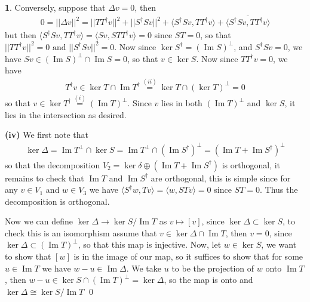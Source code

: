 \documentclass[10.5pt]{article}
\theoremstyle{definition}
\newtheorem{pb}{}
\newcommand{\gen}[1]{\langle#1\rangle}
\newcommand{\norm}[1]{\lvert\lvert#1\rvert\rvert}
\newcommand{\tand}{\text{ and }}
\begin{document}
\begin{pb}
        Conversely, suppose that \(\Delta v = 0\), then
        \begin{align}
            0 = \norm{\Delta v}^2 = \norm{TT^\dagger v}^2 + \norm{S^\dagger S v}^2 + \gen{S^\dagger S v, TT^\dagger v} + \overline{\gen{S^\dagger S v, TT^\dagger v}}
        \end{align}
        but then \(\gen{S^\dagger S v, TT^\dagger v} = \gen{Sv,STT^{\dagger}v} = 0\) since \(ST = 0\), so that \(\norm{TT^\dagger v}^2 = 0 \tand \norm{S^\dagger S v}^2 = 0\). Now since \(\ker S^\dagger = (\operatorname{Im} S)^\perp\), and \(S^\dagger S v = 0\), we have \(Sv \in (\operatorname{Im} S)^\perp \cap \operatorname{Im} S = 0\), so that \(v \in \ker S\). Now since \(TT^\dagger v = 0\), we have 
        \begin{align}
            T^\dagger v \in \ker T \cap \operatorname{Im} T^\dagger \overset{(ii)}{=} \ker T \cap (\ker T)^\perp = 0
        \end{align}
        so that \(v \in \ker T^\dagger \overset{(i)}{=} (\operatorname{Im} T)^\perp\). Since \(v\) lies in both \((\operatorname{Im} T)^\perp\) and \(\ker S\), it lies in the intersection as desired.

        \textbf{(iv)} We first note that
        \begin{align}
            \ker \Delta = \operatorname{Im} T^{\perp} \cap \ker S = \operatorname{Im} T^{\perp} \cap (\operatorname{Im} S^\dagger)^\perp = (\operatorname{Im} T + \operatorname{Im} S^\dagger)^\perp
        \end{align}
        so that the decomposition \(V_2 = \ker \delta \oplus (\operatorname{Im} T + \operatorname{Im} S^\dagger)\) is orthogonal, it remains to check that \(\operatorname{Im} T\) and \(\operatorname{Im} S^\dagger\) are orthogonal, this is simple since for any \(v \in V_1\) and \(w \in V_3\) we have \(\gen{S^\dagger w, Tv} = \gen{w,ST v} = 0\) since \(ST = 0\). Thus the decomposition is orthogonal.

        Now we can define \(\ker \Delta \to \ker S/\operatorname{Im} T\) as \(v \mapsto [v]\), since \(\ker \Delta \subset \ker S\), to check this is an isomorphism assume that \(v \in \operatorname{ker} \Delta \cap \operatorname{Im} T\), then \(v = 0\), since \(\ker \Delta \subset (\operatorname{Im} T)^\perp\), so that this map is injective. Now, let \(w \in \ker S\), we want to show that \([w]\) is in the image of our map, so it suffices to show that for some \(u \in \operatorname{Im} T\) we have \(w - u \in \operatorname{Im} \Delta\). We take \(u\) to be the projection of \(w\) onto \(\operatorname{Im} T\), then \(w - u \in \ker S \cap (\operatorname{Im} T)^\perp = \ker \Delta\), so the map is onto and \(\ker \Delta \cong \ker S/ \operatorname{Im} T\) \qed
    \end{pb}
\end{document}
